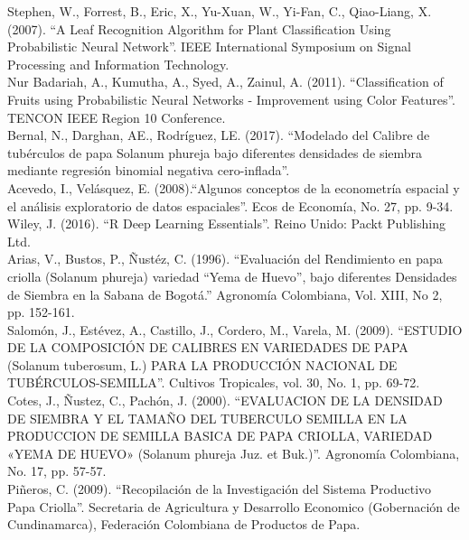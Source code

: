 \noindent
Stephen, W., Forrest, B., Eric, X., Yu-Xuan, W., Yi-Fan, C., Qiao-Liang, X. (2007). "`A Leaf Recognition Algorithm for Plant Classification Using Probabilistic Neural Network"'. IEEE International Symposium on Signal Processing and Information Technology.\\

\noindent
Nur Badariah, A., Kumutha, A., Syed, A., Zainul, A. (2011). "`Classification of Fruits using Probabilistic Neural Networks - Improvement using Color Features"'. TENCON  IEEE Region 10 Conference.\\

\noindent
Bernal, N., Darghan, AE., Rodríguez, LE. (2017). "`Modelado del Calibre de tubérculos de papa Solanum phureja bajo diferentes densidades de siembra mediante regresión binomial negativa cero-inflada"'.\\

\noindent
Acevedo, I., Velásquez, E. (2008)."`Algunos conceptos de la econometría espacial y el análisis exploratorio de datos espaciales"'. Ecos de Economía, No. 27, pp. 9-34.\\

\noindent
Wiley, J. (2016). "`R Deep Learning Essentials"'. Reino Unido: Packt Publishing Ltd.\\

\noindent
Arias, V., Bustos, P., Ñustéz, C. (1996). "`Evaluación del Rendimiento en papa criolla (Solanum phureja) variedad "`Yema de Huevo"', bajo diferentes Densidades de Siembra en la Sabana de Bogotá."' Agronomía Colombiana, Vol. XIII, No 2, pp. 152-161.\\

\noindent
Salomón, J., Estévez, A., Castillo, J., Cordero, M., Varela, M. (2009). "`ESTUDIO DE LA COMPOSICIÓN DE CALIBRES EN VARIEDADES DE PAPA (Solanum tuberosum, L.) PARA LA PRODUCCIÓN NACIONAL DE TUBÉRCULOS-SEMILLA"'.
Cultivos Tropicales, vol. 30, No. 1, pp. 69-72.\\

\noindent
Cotes, J., Ñustez, C., Pachón, J. (2000). "`EVALUACION DE LA DENSIDAD DE SIEMBRA Y EL TAMAÑO DEL TUBERCULO SEMILLA EN LA PRODUCCION DE SEMILLA BASICA DE PAPA CRIOLLA, VARIEDAD «YEMA DE HUEVO» (Solanum phureja Juz. et Buk.)"'. Agronomía Colombiana, No. 17, pp. 57-57.\\

\noindent 
Piñeros, C. (2009). "`Recopilación de la Investigación del Sistema Productivo Papa Criolla"'. Secretaria de Agricultura y Desarrollo Economico (Gobernación de Cundinamarca), Federación Colombiana de Productos de Papa.\\

